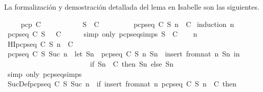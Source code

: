 \begin{isabellebody}
\begin{isamarkuptext}
  La formalización y demostración detallada del lema en Isabelle son las siguientes.%
\end{isamarkuptext}\isamarkuptrue%
\isamarkupfalse%
\ \isanewline
\ \ \ {\isachardoublequoteopen}pcp\ C{\isachardoublequoteclose}\ \isanewline
\ \ \ \ \ \ \ \ \ \ {\isachardoublequoteopen}S\ {\isasymin}\ C{\isachardoublequoteclose}\isanewline
\ \ \ \ \ \ \ \ \ {\isachardoublequoteopen}pcp{\isacharunderscore}seq\ C\ S\ n\ {\isasymin}\ C{\isachardoublequoteclose}\isanewline
%
\isadelimproof
%
\endisadelimproof
%
\isatagproof
{}\isamarkupfalse%
\ {\isacharparenleft}induction\ n{\isacharparenright}\isanewline
\ \ \isamarkupfalse%
\ {\isachardoublequoteopen}pcp{\isacharunderscore}seq\ C\ S\ {}\ {\isasymin}\ C{\isachardoublequoteclose}\isanewline
\ \ \ \ \isamarkupfalse%
\ {\isacharparenleft}simp\ only{\isacharcolon}\ pcp{\isacharunderscore}seq{\isachardot}simps{\isacharparenleft}{}{\isacharparenright}\ {\isacartoucheopen}S\ {\isasymin}\ C{\isacartoucheclose}{\isacharparenright}\isanewline
{}\isamarkupfalse%
\isanewline
\ \ \isamarkupfalse%
\ n\isanewline
\ \ \isamarkupfalse%
\ HI{\isacharcolon}{\isachardoublequoteopen}pcp{\isacharunderscore}seq\ C\ S\ n\ {\isasymin}\ C{\isachardoublequoteclose}\isanewline
\ \ \isamarkupfalse%
\ {\isachardoublequoteopen}pcp{\isacharunderscore}seq\ C\ S\ {\isacharparenleft}Suc\ n{\isacharparenright}\ {\isacharequal}\ {\isacharparenleft}let\ Sn\ {\isacharequal}\ pcp{\isacharunderscore}seq\ C\ S\ n{\isacharsemicolon}\ Sn{}\ {\isacharequal}\ insert\ {\isacharparenleft}from{\isacharunderscore}nat\ n{\isacharparenright}\ Sn\ in\isanewline
\ \ \ \ \ \ \ \ \ \ \ \ \ \ \ \ \ \ \ \ \ \ \ \ if\ Sn{}\ {\isasymin}\ C\ then\ Sn{}\ else\ Sn{\isacharparenright}{\isachardoublequoteclose}\ \isanewline
\ \ \ \ \isamarkupfalse%
\ {\isacharparenleft}simp\ only{\isacharcolon}\ pcp{\isacharunderscore}seq{\isachardot}simps{\isacharparenleft}{}{\isacharparenright}{\isacharparenright}\isanewline
\ \ \isamarkupfalse%
\ \isamarkupfalse%
\ SucDef{\isacharcolon}{\isachardoublequoteopen}pcp{\isacharunderscore}seq\ C\ S\ {\isacharparenleft}Suc\ n{\isacharparenright}\ {\isacharequal}\ {\isacharparenleft}if\ insert\ {\isacharparenleft}from{\isacharunderscore}nat\ n{\isacharparenright}\ {\isacharparenleft}pcp{\isacharunderscore}seq\ C\ S\ n{\isacharparenright}\ {\isasymin}\ C\ then\ \isanewline

\end{isabellebody}

